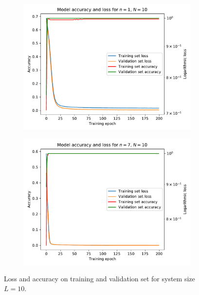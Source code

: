 \documentclass[reprint,amsmath,amssymb,aps,prb]{revtex4-2}
\begin{document}
\onecolumngrid
\begin{center}%
	\begin{figure}[H]
		\centering	
		\begin{subfigure}[c]{0.45\textwidth}
			\includegraphics[width=\textwidth]{../results/accuracy_loss_epochs/N10n1_accuracy_loss_epochs.pdf}
		\end{subfigure}
		\begin{subfigure}[c]{0.45\textwidth}
			\includegraphics[width=\textwidth]{../results/accuracy_loss_epochs/N10n7_accuracy_loss_epochs.pdf}
		\end{subfigure}
		\caption{Loss and accuracy on training and validation set for system size $L=10$.}
		\label{fig:val_acc}
	\end{figure}
\end{center}
\twocolumngrid
\end{document}
